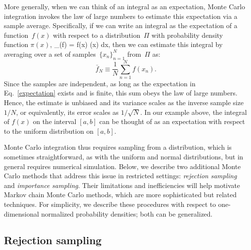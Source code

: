 \documentclass[angelino.tex]{subfiles}
\begin{document}
More generally, when we can think of an integral as an expectation,
Monte Carlo integration invokes the law of large numbers
to estimate this expectation via a sample average.
Specifically, if we can write an integral as the expectation of a
function~$f(x)$ with respect to a distribution~$\Pi$ with probability density
function $\pi(x)$,
\be
\E_\Pi(f) = \int f(x) \pi(x) dx,
\label{expectation}
\ee
then we can estimate this integral by averaging over a set of 
samples~$\{x_n\}_{n=1}^N$ from~$\Pi$ as:
\[
\bar{f}_N \equiv \frac{1}{N} \sum_{n=1}^N f(x_n).
\]
Since the samples are independent, as long as the expectation in 
Eq.~\ref{expectation} exists and is finite,
this sum obeys the law of large numbers.
Hence, the estimate is unbiased and its variance scales as the inverse sample
size $1/N$, or equivalently, its error scales as $1/\sqrt{N}$.
In our example above, the integral of $f(x)$ on the interval $[a, b]$ can be
thought of as an expectation with respect to the uniform distribution on
$[a, b]$.

Monte Carlo integration thus requires sampling from a distribution, which is
sometimes straightforward, as with the uniform and normal distributions,
but in general requires numerical simulation.
Below, we describe two additional Monte Carlo methods that address this issue
in restricted settings:
\emph{rejection sampling} and \emph{importance sampling}.
Their limitations and inefficiencies will help motivate Markov chain
Monte Carlo methods, which are more sophisticated but related techniques.
For simplicity, we describe these procedures with respect to one-dimensional
normalized probability densities; both can be generalized.

\subsection{Rejection sampling}
\end{document}
